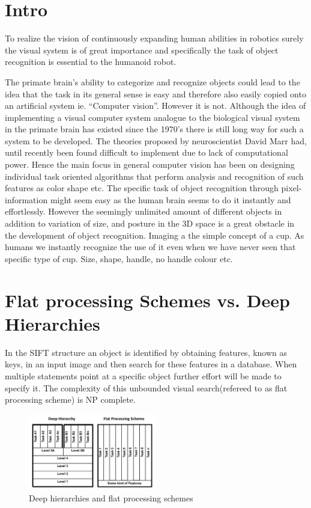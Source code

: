 \section{Intro}

To realize the vision of continuously expanding human abilities in robotics surely the visual system is of great importance and specifically the task of object recognition is essential to the humanoid robot.

The primate brain's ability to categorize and recognize objects could lead to the idea that the task in its general sense is easy and therefore also easily copied onto an artificial system ie. “Computer vision”. However it is not.
Although the idea of implementing a visual computer system analogue to the biological visual system in the primate brain has existed since the 1970's there is still long way for such a system to be developed. The theories proposed by neuroscientist David Marr \citep{VisualHierarchy} had, until recently been found difficult to implement due to lack of computational power. Hence the main focus in general computer vision has been on designing individual task oriented algorithms that perform analysis and recognition of such features as color shape etc.
The specific task of object recognition through pixel-information might seem easy as the human brain seems to do it instantly and effortlessly. However the seemingly unlimited amount of different objects in addition to variation of size, and posture in the 3D space is a great obstacle in the development of object recognition. Imaging a the simple concept of a cup. As humans we instantly recognize the use of it even when we have never seen that specific type of cup. Size, shape, handle, no handle colour etc.


\section*{Flat processing Schemes vs. Deep Hierarchies}
In the SIFT structure an object is identified by obtaining features, known as keys, in an input image and then search for these features in a database. When multiple statements point at a specific object further effort will be made to specify it. The complexity of this unbounded visual search(refereed to as flat processing scheme) is NP complete\citep{fidler2009learning}.

\begin{figure}[h!] %
\centering
\includegraphics[width=0.5\textwidth]{graphics/deepvsflat}
\caption{Deep hierarchies and flat processing schemes}
\label{fig:deepvsflat}
\end{figure}

